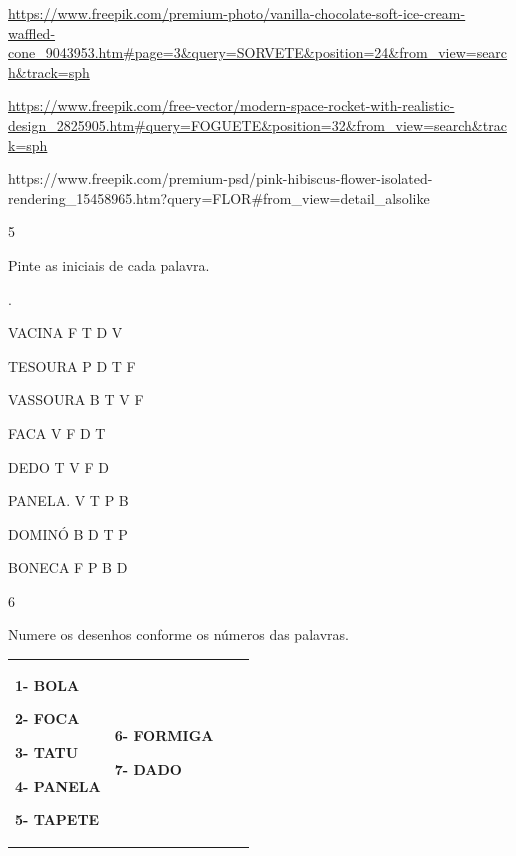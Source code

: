 {\url{https://www.freepik.com/premium-photo/vanilla-chocolate-soft-ice-cream-waffled-cone_9043953.htm\#page=3\&query=SORVETE\&position=24\&from_view=search\&track=sph}

\url{https://www.freepik.com/free-vector/modern-space-rocket-with-realistic-design_2825905.htm\#query=FOGUETE\&position=32\&from_view=search\&track=sph}

https://www.freepik.com/premium-psd/pink-hibiscus-flower-isolated-rendering\_15458965.htm?query=FLOR\#from\_view=detail\_alsolike

\num{5}

Pinte as iniciais de cada palavra.

.


VACINA F T D V

TESOURA P D T F

VASSOURA B T V F

FACA V F D T

DEDO T V F D

PANELA. V T P B

DOMINÓ B D T P

BONECA F P B D

\num{6}

Numere os desenhos conforme os números das palavras.


\begin{longtable}[]{@{}llll@{}}
\toprule
\begin{minipage}[b]{0.24\columnwidth}\raggedright\strut
\textbf{1- BOLA}

\textbf{2- FOCA}

\textbf{3- TATU}

\textbf{4- PANELA}

\textbf{5- TAPETE}\strut
\end{minipage} & \begin{minipage}[b]{0.24\columnwidth}\raggedright\strut
\textbf{6- FORMIGA}

\textbf{7- DADO}


\end{minipage}
\end{longtable}}
